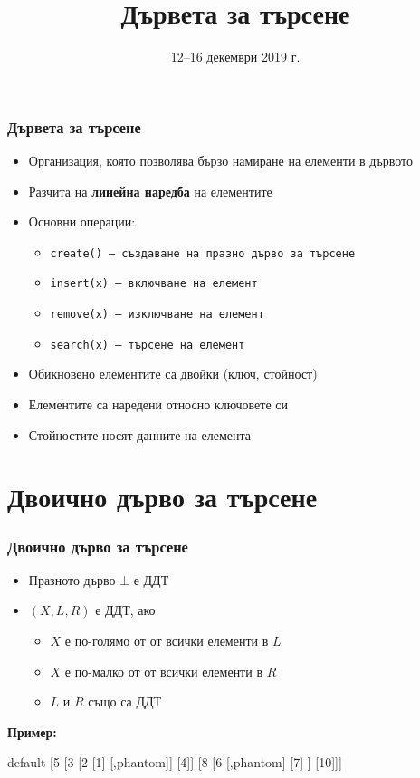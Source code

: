 \documentclass[alsotrans]{beamerswitch}
\title{Дървета за търсене}
\date{12--16 декември 2019 г.}
\newcommand{\samplebinordtree}{%
  \begin{forest}
    default [5 [3 [2 [1] [,phantom]] [4]] [8 [6 [,phantom] [7] ] [10]]]
  \end{forest}%
}
\begin{document}
\begin{frame}
  \titlepage
\end{frame}

\begin{frame}
  \frametitle{Дървета за търсене}
  \begin{itemize}
  \item Организация, която позволява бързо намиране на елементи в дървото
  \item Разчита на \textbf{линейна наредба} на елементите
  \item Основни операции:
    \begin{itemize}
    \item \tt{create()} --- създаване на празно дърво за търсене
    \item \tt{insert(x)} --- включване на елемент
    \item \tt{remove(x)} --- изключване на елемент
    \item \tt{search(x)} --- търсене на елемент
    \end{itemize}
  \item Обикновено елементите са двойки (ключ, стойност)
  \item Елементите са наредени относно ключовете си
  \item Стойностите носят данните на елемента
  \end{itemize}
\end{frame}

\section{Двоично дърво за търсене}

\begin{frame}
  \frametitle{Двоично дърво за търсене}
  \begin{definition}
    \begin{itemize}
    \item Празното дърво $\bot$ е ДДТ
    \item $(X,L,R)$ е ДДТ, ако
      \begin{itemize}
      \item $X$ е по-голямо от от всички елементи в $L$
      \item $X$ е по-малко от от всички елементи в $R$
      \item $L$ и $R$ също са ДДТ
      \end{itemize}
    \end{itemize}
  \end{definition}
  \pause
  \textbf{Пример:}
  \vspace{-2ex}
  \begin{center}
    \small
    \samplebinordtree
  \end{center}
\end{frame}
\end{document}
